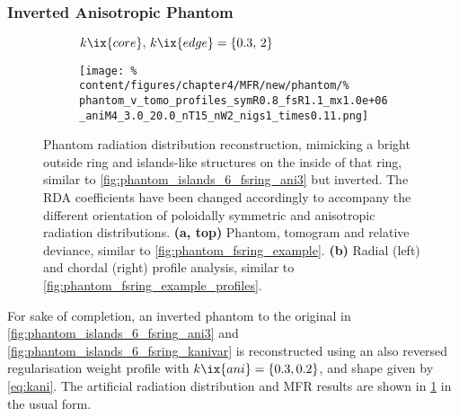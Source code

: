             \subsubsection*{Inverted Anisotropic Phantom}%
%
                \begin{figure}[t]%
                    \centering%
                    \begin{subfigure}{\textwidth}%
                        \centering%
                        \caption{$k\ix{core},\,k\ix{edge}=\left\{0.3,\,2\right\}$}%
                    \end{subfigure}%
                    \newline%
                    \begin{subfigure}{\textwidth}%
                        \centering%
                        \texttt{[image: \%
                            content/figures/chapter4/MFR/new/phantom/\%
                            phantom\_v\_tomo\_profiles\_symR0.8\_fsR1.1\_mx1.0e+06\_aniM4\_3.0\_20.0\_nT15\_nW2\_nigs1\_times0.11.png]}%
                        \caption{}%
                    \end{subfigure}%
                    \caption{Phantom radiation distribution reconstruction, mimicking a bright outside ring and islands-like structures on the inside of that ring, similar to \cref{fig:phantom_islands_6_fsring_ani3} but inverted. The RDA coefficients have been changed accordingly to accompany the different orientation of poloidally symmetric and anisotropic radiation distributions. \textbf{(a, top)} Phantom, tomogram and relative deviance, similar to \cref{fig:phantom_fsring_example}. \textbf{(b)} Radial (left) and chordal (right) profile analysis, similar to \cref{fig:phantom_fsring_example_profiles}.}\label{fig:phantom_inside_islands_6_fsring}%
                \end{figure}%
%
                For sake of completion, an inverted phantom to the original in \cref{fig:phantom_islands_6_fsring_ani3} and \ref{fig:phantom_islands_6_fsring_kanivar} is reconstructed using an also reversed regularisation weight profile with $k\ix{ani}=\left\{0.3, 0.2\right\}$, and shape given by \cref{eq:kani}. The artificial radiation distribution and MFR results are shown in \cref{fig:phantom_inside_islands_6_fsring} in the usual form.\\%
